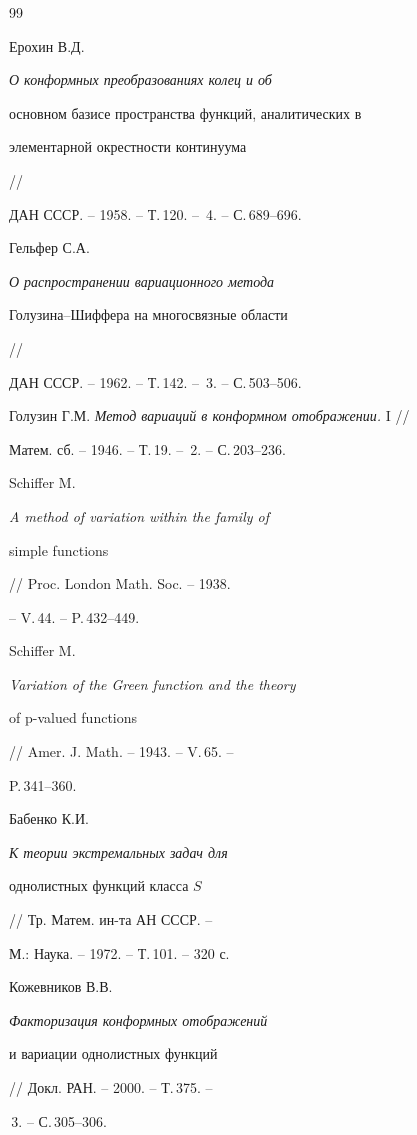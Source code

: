 \begin{thebibliography}{99}







Ерохин В.Д. {\em О конформных преобразованиях колец и об 


основном базисе пространства функций, аналитических в 


элементарной окрестности континуума} //


ДАН СССР. -- 1958. -- Т.\,120. -- \No\,4. -- С.\,689--696.




Гельфер С.А. {\em О распространении вариационного метода


Голузина--Шиффера на многосвязные области} //


ДАН СССР. -- 1962. -- Т.\,142. -- \No\,3. -- С.\,503--506.




Голузин Г.М. {\em Метод вариаций в конформном отображении.} I //


Матем. сб. -- 1946. -- Т.\,19. -- \No\,2. -- С.\,203--236.




Schiffer M. {\em A method of variation within the family of


simple functions} // Proc. London Math. Soc. -- 1938. 


-- V.\,44. -- P.\,432--449.




Schiffer M. {\em Variation of the Green function and the theory


of p-valued functions} // Amer. J. Math. -- 1943. -- V.\,65. --


P.\,341--360.




Бабенко К.И. {\em К теории экстремальных задач для 


однолистных функций класса $S$} // Тр. Матем. ин-та АН СССР. --


М.: Наука. -- 1972. -- Т.\,101. -- 320 с.




Кожевников В.В. {\em Факторизация конформных отображений


и вариации однолистных функций} // Докл. РАН. -- 2000. -- Т.\,375. -- 


\No\,3. -- С.\,305--306.





\end{thebibliography}





\vskip 1cm














\label{end}





